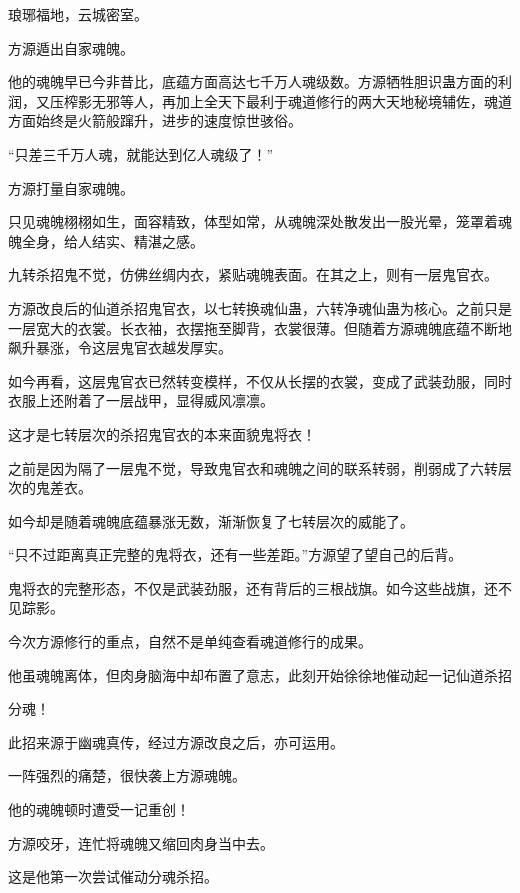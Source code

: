 
\begin{this_body}



琅琊福地，云城密室。

方源遁出自家魂魄。

他的魂魄早已今非昔比，底蕴方面高达七千万人魂级数。方源牺牲胆识蛊方面的利润，又压榨影无邪等人，再加上全天下最利于魂道修行的两大天地秘境辅佐，魂道方面始终是火箭般蹿升，进步的速度惊世骇俗。

“只差三千万人魂，就能达到亿人魂级了！”

方源打量自家魂魄。

只见魂魄栩栩如生，面容精致，体型如常，从魂魄深处散发出一股光晕，笼罩着魂魄全身，给人结实、精湛之感。

九转杀招鬼不觉，仿佛丝绸内衣，紧贴魂魄表面。在其之上，则有一层鬼官衣。

方源改良后的仙道杀招鬼官衣，以七转换魂仙蛊，六转净魂仙蛊为核心。之前只是一层宽大的衣裳。长衣袖，衣摆拖至脚背，衣裳很薄。但随着方源魂魄底蕴不断地飙升暴涨，令这层鬼官衣越发厚实。

如今再看，这层鬼官衣已然转变模样，不仅从长摆的衣裳，变成了武装劲服，同时衣服上还附着了一层战甲，显得威风凛凛。

这才是七转层次的杀招鬼官衣的本来面貌鬼将衣！

之前是因为隔了一层鬼不觉，导致鬼官衣和魂魄之间的联系转弱，削弱成了六转层次的鬼差衣。

如今却是随着魂魄底蕴暴涨无数，渐渐恢复了七转层次的威能了。

“只不过距离真正完整的鬼将衣，还有一些差距。”方源望了望自己的后背。

鬼将衣的完整形态，不仅是武装劲服，还有背后的三根战旗。如今这些战旗，还不见踪影。

今次方源修行的重点，自然不是单纯查看魂道修行的成果。

他虽魂魄离体，但肉身脑海中却布置了意志，此刻开始徐徐地催动起一记仙道杀招

分魂！

此招来源于幽魂真传，经过方源改良之后，亦可运用。

一阵强烈的痛楚，很快袭上方源魂魄。

他的魂魄顿时遭受一记重创！

方源咬牙，连忙将魂魄又缩回肉身当中去。

这是他第一次尝试催动分魂杀招。


\end{this_body}
